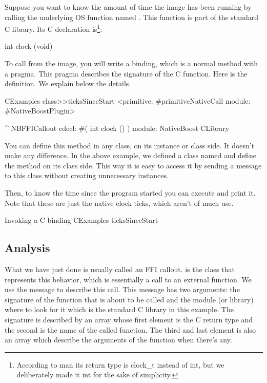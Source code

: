 \documentclass[a4paper,10pt,twoside]{book}
\begin{document}
Suppose you want to know the amount of time the image has been running by calling the underlying OS function named . 
This function is part of the standard C library. Its C declaration is\footnote{According to man its return type is clock\_t instead of int, but we deliberately made it int for the sake of simplicity. }:

\begin{code}{}
int clock (void)
\end{code}

To call  from the image, you will write a binding, which is a normal method with a  pragma. This pragma describes the signature of the C function. Here is the definition. We  explain below the details.

\begin{code}{}
CExamples class>>ticksSinceStart
	<primitive: #primitiveNativeCall module: #NativeBoostPlugin>
	
	^ NBFFICallout cdecl: #( int clock () ) module: NativeBoost CLibrary
\end{code}



You can define this method in any class, on its instance or class side.
It doesn't make any difference. In the above example, we defined a class named  and define the method on its class side. This way it is easy to access it by sending a message to this class without creating unnecessary instances. 

Then, to know the time since the program started you can execute and print it.
Note that these are just the native clock ticks, which aren't of much use. 
\begin{script}{Invoking a C binding}
CExamples ticksSinceStart
\end{script}


\subsection{Analysis}
What we have just done is usually called an FFI callout.  is the class that represents this behavior, which is essentially a call to an external function.
We use the  message  to describe this call. 
This message has two arguments: the signature of the function that is about to be called and the module (or library) where to look for it which is the standard C library in this example. 
The signature is described by an array whose first element is the C return type and the second is the name of the called function.
The third and last element is also an array which describe the arguments of the function when there's any. 
\end{document}
